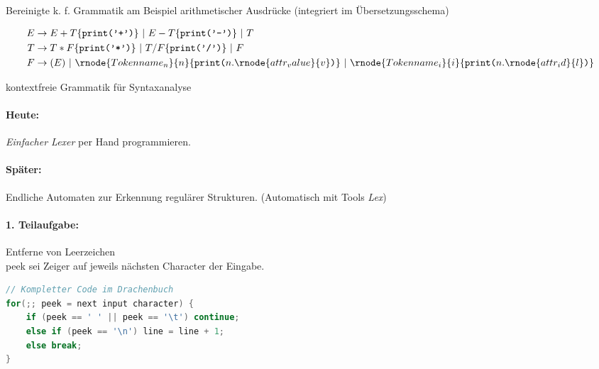\Bsp Bereinigte k. f. Grammatik am Beispiel arithmetischer Ausdrücke (integriert im Übersetzungsschema)
\newcommand{\print}[1]{\{\texttt{print('#1')}\}}
\newcommand{\printx}[1]{\{\texttt{print(}#1\texttt{)}\}}
\begin{center}
\begin{minipage}{0.7\linewidth}
\begin{align*}
 E &\to E + T\print{+}\ |\ E - T\print{-}\ |\ T \\
 T &\to T * F\print{*}\ |\ T / F\print{/}\ |\ F \\
 F &\to (E)\ |\ \rnode{Tokenname_n}{n}\printx{n.\rnode{attr_value}{v}}\ |\ \rnode{Tokenname_i}{i}\printx{n.\rnode{attr_id}{l}}
\end{align*}
{\footnotesize {} \hfill {} \hfill {} \hfill {}}
\end{minipage}
\vline\hfill
\begin{minipage}{0.25\linewidth}
 kontextfreie Grammatik für Syntaxanalyse
\end{minipage}
\end{center}
\paragraph{Heute:} \emph{Einfacher Lexer} per Hand programmieren.
\paragraph{Später:} Endliche Automaten zur Erkennung regulärer Strukturen. (Automatisch mit Tools \emph{Lex})

\paragraph{1. Teilaufgabe:} Entferne von Leerzeichen\\
peek sei Zeiger auf jeweils nächsten Character der Eingabe.

\begin{lstlisting}[language=Java]
// Kompletter Code im Drachenbuch
for(;; peek = next input character) {
    if (peek == ' ' || peek == '\t') continue;
    else if (peek == '\n') line = line + 1;
    else break;
}
\end{lstlisting}

